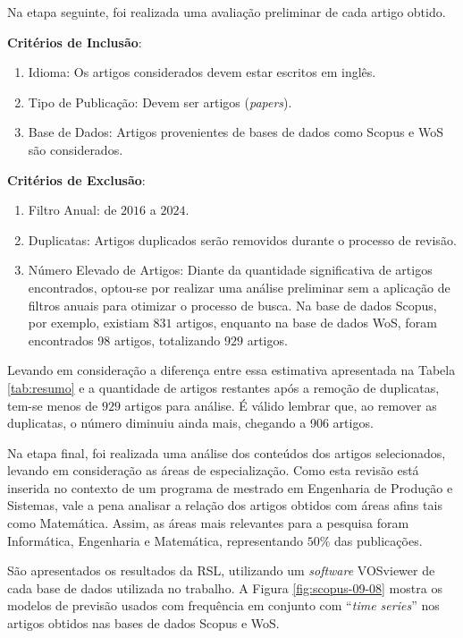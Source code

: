 Na etapa seguinte, foi realizada uma avaliação preliminar de cada artigo obtido.

\noindent\textbf{Critérios de Inclusão}:

\begin{enumerate}
	\item Idioma: Os artigos considerados devem estar escritos em inglês.
	\item Tipo de Publicação: Devem ser artigos (\textit{papers}).
	\item Base de Dados: Artigos provenientes de bases de dados como Scopus e WoS são considerados.
\end{enumerate}

\noindent\textbf{Critérios de Exclusão}:

\begin{enumerate}
	\item Filtro Anual: de $2016$ a $2024$.
	\item Duplicatas: Artigos duplicados serão removidos durante o processo de revisão.
	\item Número Elevado de Artigos: Diante da quantidade significativa de artigos encontrados, optou-se por realizar uma análise preliminar sem a aplicação de filtros anuais para otimizar o processo de busca. Na base de dados Scopus, por exemplo, existiam $831$ artigos, enquanto na base de dados WoS, foram encontrados 98 artigos, totalizando $929$ artigos.
\end{enumerate}


Levando em consideração a diferença entre essa estimativa apresentada na Tabela \ref{tab:resumo} e a quantidade de artigos restantes após a remoção de duplicatas, tem-se menos de $929$ artigos para análise. É válido lembrar que, ao remover as duplicatas, o número diminuiu ainda mais, chegando a 906 artigos.

Na etapa final, foi realizada uma análise dos conteúdos dos artigos selecionados, levando em consideração as áreas de especialização. Como esta revisão está inserida no contexto de um programa de mestrado em Engenharia de Produção e Sistemas, vale a pena analisar a relação dos artigos obtidos com áreas afins tais como Matemática. Assim, as áreas mais relevantes para a pesquisa foram Informática, Engenharia e Matemática, representando $50\%$ das publicações. 

São apresentados os resultados da RSL, utilizando um \textit{software} VOSviewer de cada base de dados utilizada no trabalho. 
A Figura \ref{fig:scopus-09-08} mostra os modelos de previsão usados com frequência em conjunto com ``\textit{time series}'' nos artigos obtidos nas bases de dados Scopus e WoS. 

